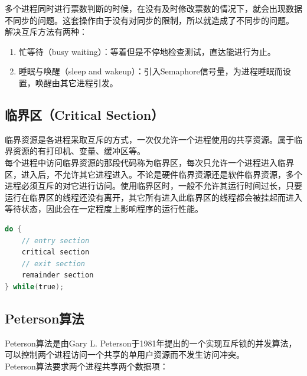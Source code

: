 多个进程同时进行票数判断的时候，在没有及时修改票数的情况下，就会出现数据不同步的问题。这套操作由于没有对同步的限制，所以就造成了不同步的问题。\\

解决互斥方法有两种：

\begin{enumerate}
    \item 忙等待（busy waiting）：等着但是不停地检查测试，直达能进行为止。

    \item 睡眠与唤醒（sleep and wakeup）：引入Semaphore信号量，为进程睡眠而设置，唤醒由其它进程引发。
\end{enumerate}

\vspace{0.5cm}

\subsection{临界区（Critical Section）}

临界资源是各进程采取互斥的方式，一次仅允许一个进程使用的共享资源。属于临界资源的有打印机、变量、缓冲区等。\\

每个进程中访问临界资源的那段代码称为临界区，每次只允许一个进程进入临界区，进入后，不允许其它进程进入。不论是硬件临界资源还是软件临界资源，多个进程必须互斥的对它进行访问。使用临界区时，一般不允许其运行时间过长，只要运行在临界区的线程还没有离开，其它所有进入此临界区的线程都会被挂起而进入等待状态，因此会在一定程度上影响程序的运行性能。\\


\begin{lstlisting}[language=C]
do {
	// entry section
	critical section
	// exit section
	remainder section
} while(true);
\end{lstlisting}

\vspace{0.5cm}

\subsection{Peterson算法}

Peterson算法是由Gary L. Peterson于1981年提出的一个实现互斥锁的并发算法，可以控制两个进程访问一个共享的单用户资源而不发生访问冲突。\\

Peterson算法要求两个进程共享两个数据项：\\

